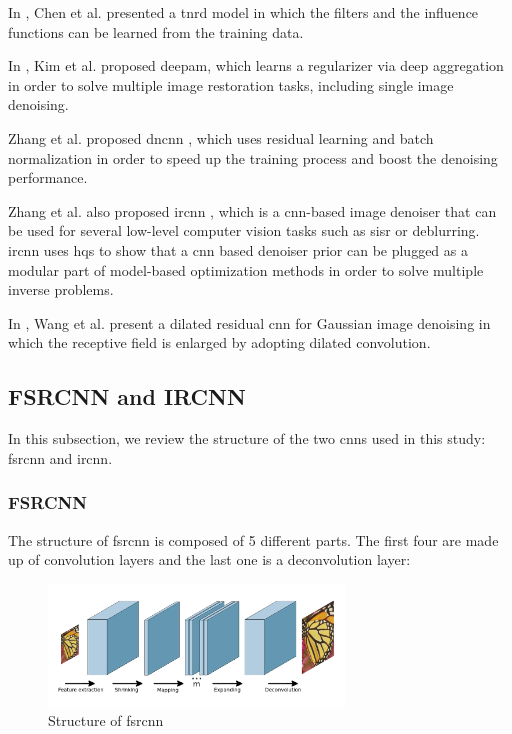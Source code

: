 In \cite{TNRD}, Chen et al. presented a  \gls{tnrd} model in which the filters and the influence functions can be learned from the training data. 

In \cite{DEEPAM}, Kim et al. proposed \gls{deepam}, which learns a regularizer via deep aggregation in order to solve multiple image restoration tasks, including single image denoising.  

Zhang et al. proposed \gls{dncnn} \cite{DNCNN}, which uses residual learning and batch normalization in order to speed up the training process and boost the denoising performance.

Zhang et al. also proposed \gls{ircnn} \cite{IRCNN}, which is a \gls{cnn}-based image denoiser that can be used for several low-level computer vision tasks such as \gls{sisr} or deblurring. \gls{ircnn} uses \gls{hqs} to show that a \gls{cnn} based denoiser prior can be plugged as a modular part of model-based optimization methods in order to solve multiple inverse problems.

In \cite{DILATED}, Wang et al. present a dilated residual \gls{cnn} for Gaussian image denoising in which the receptive field is enlarged by adopting dilated convolution.

\subsection{FSRCNN and IRCNN}
In this subsection, we review the structure of the two \glspl{cnn} used in this study: \gls{fsrcnn} and \gls{ircnn}.

\subsubsection{FSRCNN} The structure of \gls{fsrcnn} is composed of 5 different parts. The first four are made up of convolution layers and the last one is a deconvolution layer:

\begin{figure}
	\centering
	\includegraphics[width=0.7\textwidth]{images/fsrcnn.png}
	\caption{Structure of \gls{fsrcnn}}
	\label{fig:fsrcnn}
\end{figure}

